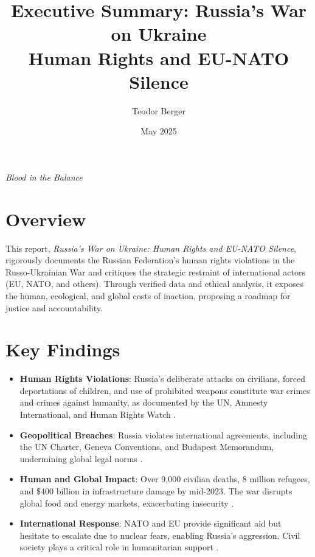 \documentclass[a4paper,12pt]{article}
\title{Executive Summary: Russia’s War on Ukraine \\ Human Rights and EU-NATO Silence}
\author{Teodor Berger}
\date{May 2025}
\begin{document}
\maketitle

\vspace{-1em}
\begin{center}
    \small \textit{Blood in the Balance}
\end{center}

\section*{Overview}
This report, \textit{Russia’s War on Ukraine: Human Rights and EU-NATO Silence}, rigorously documents the Russian Federation’s human rights violations in the Russo-Ukrainian War and critiques the strategic restraint of international actors (EU, NATO, and others). Through verified data and ethical analysis, it exposes the human, ecological, and global costs of inaction, proposing a roadmap for justice and accountability.

\section*{Key Findings}
\begin{itemize}
    \item \textbf{Human Rights Violations}: Russia’s deliberate attacks on civilians, forced deportations of children, and use of prohibited weapons constitute war crimes and crimes against humanity, as documented by the UN, Amnesty International, and Human Rights Watch \cite{un_2023, amnesty_2022, hrw_2023}.
    \item \textbf{Geopolitical Breaches}: Russia violates international agreements, including the UN Charter, Geneva Conventions, and Budapest Memorandum, undermining global legal norms \cite{un_charter, geneva_1949, budapest_1994}.
    \item \textbf{Human and Global Impact}: Over 9,000 civilian deaths, 8 million refugees, and \$400 billion in infrastructure damage by mid-2023. The war disrupts global food and energy markets, exacerbating insecurity \cite{un_2023, unhcr_2023, world_bank_2023}.
    \item \textbf{International Response}: NATO and EU provide significant aid but hesitate to escalate due to nuclear fears, enabling Russia’s aggression. Civil society plays a critical role in humanitarian support \cite{osce_2023, unhcr_2023}.
\end{itemize}
\end{document}
